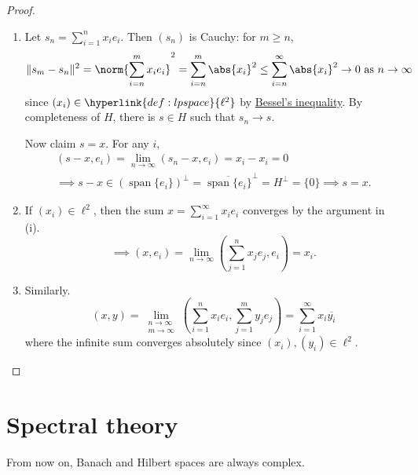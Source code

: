 \documentclass{article}
\DeclareMathOperator{\spn}{span}
\begin{document}
\begin{proof}
    \leavevmode
    \begin{enumerate}[label=(\roman*)]
        \item Let $s_n = \sum_{i=1}^n x_i e_i$. Then $(s_n)$ is Cauchy: for $m \geq n$,
            \begin{equation*}
                \|s_m - s_n\|^2 = \norm{\sum_{i=n}^m x_i e_i}^2 = \sum_{i=n}^m \abs{x_i}^2 \leq \sum_{i=n}^\infty \abs{x_i}^2 \to 0 \text{ as } n \to \infty
            \end{equation*}
            since $(x_i) \in \hyperlink{def:lpspace}{\ell^2}$ by \hyperlink{prop:bessel}{Bessel's inequality}.
            By completeness of $H$, there is $s \in H$ such that $s_n \to s$.

            Now claim $s = x$.
            For any $i$,
            \begin{gather*}
                (s-x, e_i) = \lim_{n \to \infty} (s_n - x, e_i) = x_i - x_i = 0 \\
                \implies s-x \in (\spn \{e_i\})^\bot = \overline{\spn \{e_i\}}^\bot = H^\bot = \{0\} \implies s = x.
            \end{gather*}
        \item If $(x_i) \in \ell^2$, then the sum $x = \sum_{i=1}^\infty x_i e_i$ converges by the argument in (i).
            \begin{equation*}
                \implies (x, e_i) = \lim_{n \to \infty} \left(\sum_{j=1}^n x_j e_j, e_i\right) = x_i.
            \end{equation*}
        \item Similarly.
            \begin{equation*}
            (x, y) = \lim_{\substack{n \to \infty \\ m \to \infty}} \left(\sum_{i=1}^n x_i e_i, \sum_{j=1}^m y_j e_j\right) = \sum_{i=1}^\infty x_i \overline{y_i}
            \end{equation*}
            where the infinite sum converges absolutely since $(x_i), (y_i) \in \ell^2$. \qedhere
    \end{enumerate}
\end{proof}

\clearpage
\section{Spectral theory}
From now on, Banach and Hilbert spaces are always complex.
\end{document}
